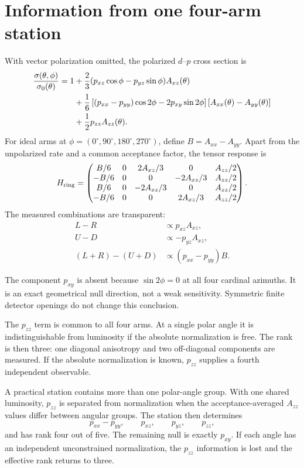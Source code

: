 \documentclass[11pt,a4paper]{article}
\begin{document}
\section{Information from one four-arm station}

With vector polarization omitted, the polarized $d$--$p$ cross section is
\begin{align}
 \frac{\sigma(\theta,\phi)}{\sigma_0(\theta)}=1
 &+\frac23(p_{xz}\cos\phi-p_{yz}\sin\phi)A_{xz}(\theta)\notag\\
 &+\frac16\left[(p_{xx}-p_{yy})\cos2\phi
 -2p_{xy}\sin2\phi\right][A_{xx}(\theta)-A_{yy}(\theta)]\notag\\
 &+\frac12p_{zz}A_{zz}(\theta).
 \label{eq:cross-section}
\end{align}
For ideal arms at
$\phi=(0^\circ,90^\circ,180^\circ,270^\circ)$, define
$B=A_{xx}-A_{yy}$.  Apart from the unpolarized rate and a common acceptance
factor, the tensor response is
\begin{equation}
 H_{\rm ring}=
 \begin{pmatrix}
 B/6&0& 2A_{xz}/3&0&A_{zz}/2\\
 -B/6&0&0&-2A_{xz}/3&A_{zz}/2\\
 B/6&0&-2A_{xz}/3&0&A_{zz}/2\\
 -B/6&0&0&2A_{xz}/3&A_{zz}/2
 \end{pmatrix}.
 \label{eq:ring-response}
\end{equation}
The measured combinations are transparent:
\begin{align}
 L-R&\propto p_{xz}A_{xz},\\
 U-D&\propto-p_{yz}A_{xz},\\
 (L+R)-(U+D)&\propto(p_{xx}-p_{yy})B.
\end{align}

The component $p_{xy}$ is absent because $\sin2\phi=0$ at all four cardinal
azimuths.  It is an exact geometrical null direction, not a weak sensitivity.
Symmetric finite detector openings do not change this conclusion.

The $p_{zz}$ term is common to all four arms.  At a single polar angle it is
indistinguishable from luminosity if the absolute normalization is free.  The
rank is then three: one diagonal anisotropy and two off-diagonal components are
measured.  If the absolute normalization is known, $p_{zz}$ supplies a fourth
independent observable.

A practical station contains more than one polar-angle group.  With one shared
luminosity, $p_{zz}$ is separated from normalization when the
acceptance-averaged $A_{zz}$ values differ between angular groups.  The station
then determines
\begin{equation}
 p_{xx}-p_{yy},\qquad p_{xz},\qquad p_{yz},\qquad p_{zz},
\end{equation}
and has rank four out of five.  The remaining null is exactly $p_{xy}$.  If each
angle has an independent unconstrained normalization, the $p_{zz}$ information
is lost and the effective rank returns to three.
\end{document}
